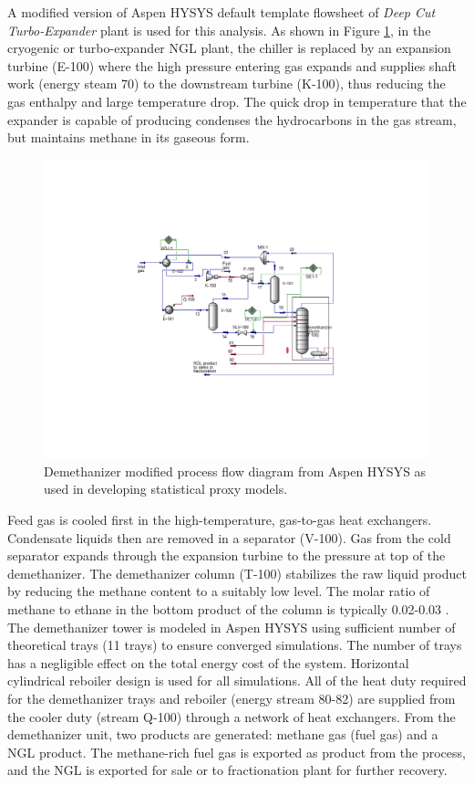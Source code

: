 \documentclass[11pt]{report}
\begin{document}
A modified version of Aspen HYSYS default template flowsheet of \emph{Deep Cut Turbo-Expander} plant is used for this analysis. As shown in Figure \ref{fig:demethanizer_aspen}, in the cryogenic or turbo-expander NGL plant, the chiller is replaced by an expansion turbine (E-100) where the high pressure entering gas expands and supplies shaft work (energy steam 70) to the downstream turbine (K-100), thus reducing the gas enthalpy and large temperature drop. The quick drop in temperature that the expander is capable of producing condenses the hydrocarbons in the gas stream, but maintains methane in its gaseous form. 

\begin{figure}
\includegraphics[width=0.85\columnwidth]{images/demethanizer_aspen.pdf}
\caption{Demethanizer modified process flow diagram from Aspen HYSYS as used in developing statistical proxy models.}
\label{fig:demethanizer_aspen}
\end{figure}

Feed gas is cooled first in the high-temperature, gas-to-gas heat exchangers. Condensate liquids then are removed in a separator (V-100). Gas from the cold separator expands through the expansion turbine to the pressure at top of the demethanizer. The demethanizer column (T-100) stabilizes the raw liquid product by reducing the methane content to a suitably low level. The molar ratio of methane to ethane in the bottom product of the column is typically 0.02-0.03 \cite{Manning1991}. The demethanizer tower is modeled in Aspen HYSYS using sufficient number of theoretical trays (11 trays) to ensure converged simulations. The number of trays has a negligible effect on the total energy cost of the system. Horizontal cylindrical reboiler design is used for all simulations. All of the heat duty required for the demethanizer trays and reboiler (energy stream 80-82) are supplied from the cooler duty (stream Q-100) through a network of heat exchangers. From the demethanizer unit, two products are generated: methane gas (fuel gas) and a NGL product. The methane-rich fuel gas is exported as product from the process, and the NGL is exported for sale or to fractionation plant for further recovery. 
\end{document}
